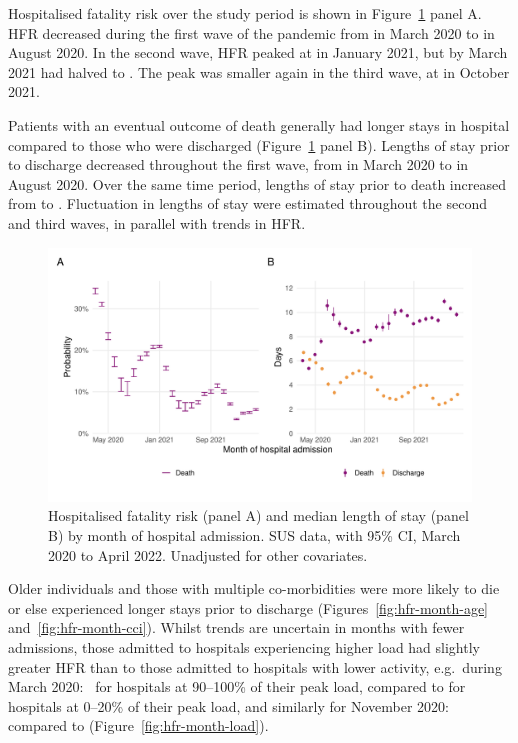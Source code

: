 Hospitalised fatality risk over the study period is shown in Figure~\ref{fig:hfr-month} panel A. HFR decreased during the first wave of the pandemic from  in March 2020 to  in August 2020. In the second wave, HFR peaked at  in January 2021, but by March 2021 had halved to . The peak was smaller again in the third wave, at  in October 2021.

Patients with an eventual outcome of death generally had longer stays in hospital compared to those who were discharged (Figure~\ref{fig:hfr-month} panel B). Lengths of stay prior to discharge decreased throughout the first wave, from  in March 2020 to  in August 2020. Over the same time period, lengths of stay prior to death increased from  to . Fluctuation in lengths of stay were estimated throughout the second and third waves, in parallel with trends in HFR\@.

\begin{figure}[htbp!]
    \centering
    \includegraphics[width=\textwidth]{hfr_month.pdf}
    \caption[Hospitalised fatality risk and median length of stay by month of admission in SUS data, March 2020 to April 2022]{Hospitalised fatality risk (panel A) and median length of stay (panel B) by month of hospital admission. SUS data, with 95\% CI, March 2020 to April 2022. Unadjusted for other covariates.}\label{fig:hfr-month}
\end{figure}

Older individuals and those with multiple co-morbidities were more likely to die or else experienced longer stays prior to discharge (Figures~\ref{fig:hfr-month-age} and~\ref{fig:hfr-month-cci}). Whilst trends are uncertain in months with fewer admissions, those admitted to hospitals experiencing higher load had slightly greater HFR than to those admitted to hospitals with lower activity, e.g.\ during March 2020:\  for hospitals at 90--100\% of their peak load, compared to  for hospitals at 0--20\% of their peak load, and similarly for November 2020:\  compared to  (Figure~\ref{fig:hfr-month-load}).

